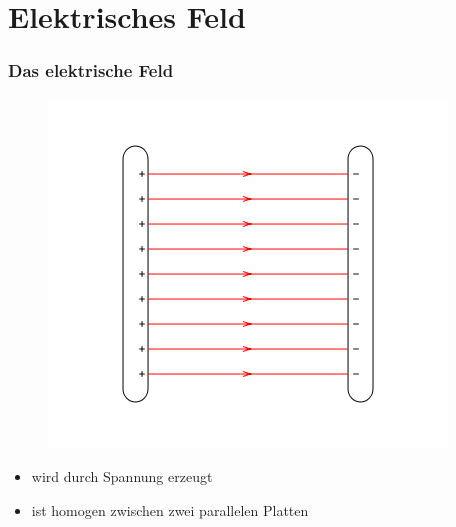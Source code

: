 

\subtitle{Technik Klasse E 08: \\
  Elektromagnetisches Feld \\[2em]}
\date{Stand 07.11.2016}


\section*{Elektrisches Feld}
\begin{frame}
  \frametitle{Das elektrische Feld}
  \begin{center}
    \begin{figure}
      \includegraphics[width=\textwidth,height=.6\textheight,keepaspectratio]{e08/PlattenkondensatorFeld.png}
    \end{figure}
    \begin{itemize}
      \item wird durch Spannung erzeugt
      \item ist homogen zwischen zwei parallelen Platten
    \end{itemize}
  \end{center}
\end{frame}

